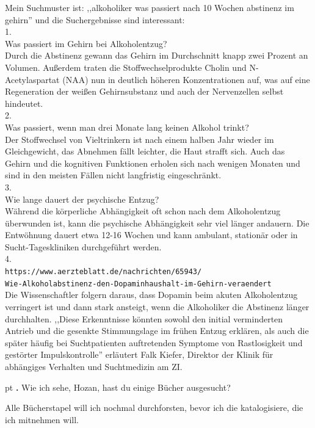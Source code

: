 \documentclass[10pt,a4paper]{article}
\newcounter{notec}
\newcommand\notep[1]{%
  \stepcounter{notec}
  \vskip #1pt
  {\bf\arabic{notec}.}
}
\begin{document}
\begin{mdframed}[style=daystyle]
  \vskip 2pt
  Mein Suchmuster ist: ,,alkoholiker was passiert nach 10 Wochen abstinenz im
  gehirn'' und die Suchergebnisse sind interessant: \\
  1. \\
  Was passiert im Gehirn bei Alkoholentzug? \\
  Durch die Abstinenz gewann das Gehirn im Durchschnitt knapp zwei Prozent an
  Volumen. Außerdem traten die Stoffwechselprodukte Cholin und N-Acetylaspartat
  (NAA) nun in deutlich höheren Konzentrationen auf, was auf eine Regeneration
  der weißen Gehirnsubstanz und auch der Nervenzellen selbst hindeutet. \\
  2. \\
  Was passiert, wenn man drei Monate lang keinen Alkohol trinkt? \\
  Der Stoffwechsel von Vieltrinkern ist nach einem halben Jahr wieder im
  Gleichgewicht, das Abnehmen fällt leichter, die Haut strafft sich. Auch das
  Gehirn und die kognitiven Funktionen erholen sich nach wenigen Monaten und
  sind in den meisten Fällen nicht langfristig eingeschränkt. \\
  3. \\
  Wie lange dauert der psychische Entzug? \\
  Während die körperliche Abhängigkeit oft schon nach dem Alkoholentzug
  überwunden ist, kann die psychische Abhängigkeit sehr viel länger andauern.
  Die Entwöhnung dauert etwa 12-16 Wochen und kann ambulant, stationär oder in
  Sucht-Tageskliniken durchgeführt werden. \\
  4. \\
  \verb+https://www.aerzteblatt.de/nachrichten/65943/+ \\
  \verb+Wie-Alkoholabstinenz-den-Dopaminhaushalt-im-Gehirn-veraendert+ \\
  Die Wissenschaftler folgern daraus, dass Dopamin beim akuten Alkoholentzug
  verringert ist und dann stark ansteigt, wenn die Alkoholiker die Abstinenz
  länger durchhalten. ,,Diese Erkenntnisse könnten sowohl den initial
  verminderten Antrieb und die gesenkte Stimmungslage im frühen Entzug erklären,
  als auch die später häufig bei Suchtpatienten auftretenden Symptome von
  Rastlosigkeit und gestörter Impulskontrolle'' erläutert Falk Kiefer, Direktor
  der Klinik für abhängiges Verhalten und Suchtmedizin am ZI.


  \notep 4 Wie ich sehe, Hozan, hast du einige Bücher ausgesucht?

  \vskip 2pt
  Alle Bücherstapel will ich nochmal durchforsten, bevor ich die katalogisiere,
  die ich mitnehmen will.


\end{mdframed}
\end{document}
